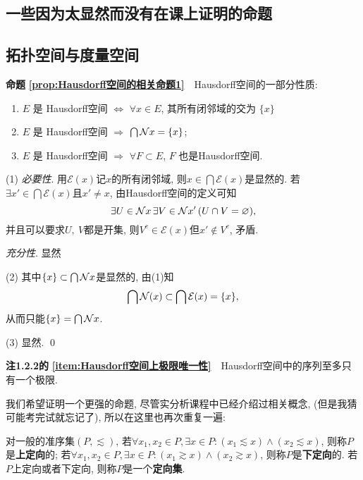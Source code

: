 
\begin{appendix}
	
	\chapter{一些因为太显然而没有在课上证明的命题}
	
	\section{拓扑空间与度量空间}
	
	\textbf{命题\,\,\ref{prop:Hausdorff空间的相关命题1}}\ \ Hausdorff空间的一部分性质:
	\begin{enumerate}[(1)]
		\item  $ E $ 是 Hausdorff空间 $ \Longleftrightarrow $ $ \forall x\in E $, 其所有闭邻域的交为 $\{ x \}$
	    \item $ E $ 是 Hausdorff空间 $ \Longrightarrow $ $\bigcap \mathcal{N}{x}=\{x\}$;
	    \item $ E $ 是 Hausdorff空间 $ \Longrightarrow $ $ \forall F\subset E $, $ F $ 也是Hausdorff空间. 
	\end{enumerate}
	\begin{Proof}
	(1) \textsl{必要性}. 用$ \mathcal{E}(x) $记$ x $的所有闭邻域, 则$ x\in\bigcap\mathcal{E}(x) $是显然的. 若$ \exists x'\in\bigcap\mathcal{E}(x) $且$ x'\ne x $, 由Hausdorff空间的定义可知
	\[
	\exists U\in\mathcal{N}{x}\,\exists V\in\mathcal{N}{x'}\,(U\cap V=\varnothing),
	\]
	并且可以要求$ U,\ V $都是开集, 则$ V^c\in\mathcal{E}(x) $但$ x'\notin V^c $, 矛盾.
	
	\textsl{充分性}. 显然
	
	(2) 其中$ \{x\}\subset\bigcap\mathcal{N}{x} $是显然的, 由(1)知
	\[
	\bigcap\mathcal{N}(x)\subset\bigcap\mathcal{E}(x)=\{x\},
	\]
	从而只能$ \{x\}=\bigcap\mathcal{N}{x} $.
	
	(3) 显然.	\qed
	\end{Proof}
	
	\textbf{注1.2.2的\,\,\ref{item:Hausdorff空间上极限唯一性}}\ \ Hausdorff空间中的序列至多只有一个极限.
	
	我们希望证明一个更强的命题, 尽管实分析课程中已经介绍过相关概念, (但是我猜可能考完试就忘记了), 所以在这里也再次重复一遍:
	\begin{Definition}
		对一般的准序集$ (P, \lesssim) $, 若$ \forall x_1, x_2\in P, \exists x\in P : (x_1\lesssim x)\land (x_2\lesssim x) $, 则称$ P $是\textbf{上定向}的; 若$ \forall x_1, x_2\in P, \exists x\in P : (x_1\gtrsim x)\land (x_2\gtrsim x) $, 则称$ P $是\textbf{下定向}的. 若$ P $上定向或者下定向, 则称$ P $是一个\textbf{定向集}.
		

\end{Definition}
\end{appendix}
